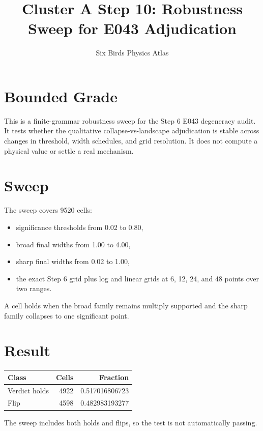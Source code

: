 \documentclass[11pt]{article}
\title{Cluster A Step 10: Robustness Sweep for E043 Adjudication}
\author{Six Birds Physics Atlas}
\date{}
\begin{document}
\maketitle

\section*{Bounded Grade}

This is a finite-grammar robustness sweep for the Step 6 E043 degeneracy audit. It tests whether the qualitative collapse-vs-landscape adjudication is stable across changes in threshold, width schedules, and grid resolution. It does not compute a physical value or settle a real mechanism.

\section*{Sweep}

The sweep covers 9520 cells:

\begin{itemize}
\item significance thresholds from 0.02 to 0.80,
\item broad final widths from 1.00 to 4.00,
\item sharp final widths from 0.02 to 1.00,
\item the exact Step 6 grid plus log and linear grids at 6, 12, 24, and 48 points over two ranges.
\end{itemize}

A cell holds when the broad family remains multiply supported and the sharp family collapses to one significant point.

\section*{Result}

\begin{center}
\begin{tabular}{lrr}
\toprule
Class & Cells & Fraction \\
\midrule
Verdict holds & 4922 & 0.517016806723 \\
Flip & 4598 & 0.482983193277 \\
\bottomrule
\end{tabular}
\end{center}

The sweep includes both holds and flips, so the test is not automatically passing.
\end{document}
